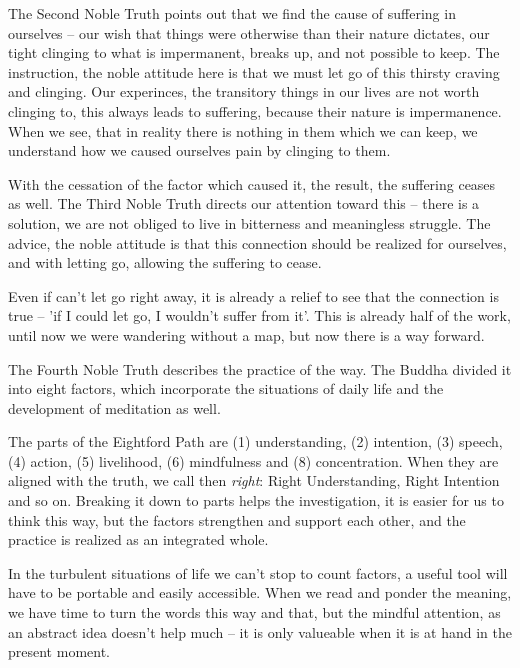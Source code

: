 The Second Noble Truth points out that we find the cause of suffering in
ourselves -- our wish that things were otherwise than their nature
dictates, our tight clinging to what is impermanent, breaks up, and not
possible to keep. The instruction, the noble attitude here is that we
must let go of this thirsty craving and clinging. Our experinces, the
transitory things in our lives are not worth clinging to, this always
leads to suffering, because their nature is impermanence. When we see,
that in reality there is nothing in them which we can keep, we
understand how we caused ourselves pain by clinging to them.

With the cessation of the factor which caused it, the result, the
suffering ceases as well. The Third Noble Truth directs our attention
toward this -- there is a solution, we are not obliged to live in
bitterness and meaningless struggle. The advice, the noble attitude is
that this connection should be realized for ourselves, and with letting
go, allowing the suffering to cease.

Even if can't let go right away, it is already a relief to see that the
connection is true -- 'if I could let go, I wouldn't suffer from it'.
This is already half of the work, until now we were wandering without a
map, but now there is a way forward.

The Fourth Noble Truth describes the practice of the way. The Buddha
divided it into eight factors, which incorporate the situations of daily
life and the development of meditation as well.

The parts of the Eightford Path are (1) understanding, (2) intention,
(3) speech, (4) action, (5) livelihood, (6) mindfulness and (8)
concentration. When they are aligned with the truth, we call then
\emph{right}: Right Understanding, Right Intention and so on. Breaking
it down to parts helps the investigation, it is easier for us to think
this way, but the factors strengthen and support each other, and the
practice is realized as an integrated whole.

In the turbulent situations of life we can't stop to count factors, a
useful tool will have to be portable and easily accessible. When we read
and ponder the meaning, we have time to turn the words this way and
that, but the mindful attention, as an abstract idea doesn't help much
-- it is only valueable when it is at hand in the present moment.
